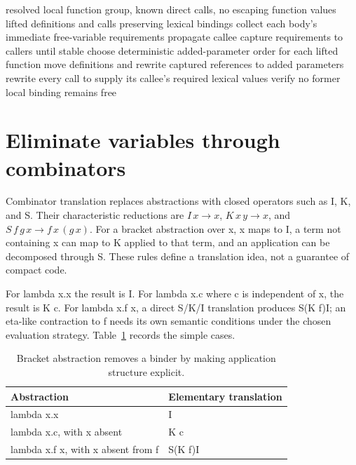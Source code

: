 \begin{algorithm}[htbp]
\caption{Lift a nonescaping direct-call group with propagated capture requirements.}
\label{alg:ch91-lift}
\begin{pseudocode}
\Require resolved local function group, known direct calls, no escaping function values
\Ensure lifted definitions and calls preserving lexical bindings
\State collect each body's immediate free-variable requirements
\State propagate callee capture requirements to callers until stable
\State choose deterministic added-parameter order for each lifted function
\State move definitions and rewrite captured references to added parameters
\State rewrite every call to supply its callee's required lexical values
\State verify no former local binding remains free
\end{pseudocode}
\end{algorithm}

\section{Eliminate variables through combinators}
\label{sec:ch91-combinators}
Combinator translation replaces abstractions with closed operators such as I, K, and S.
Their characteristic reductions are $I\,x\to x$, $K\,x\,y\to x$, and $S\,f\,g\,x\to f\,x\,(g\,x)$.
For a bracket abstraction over x, x maps to I, a term not containing x can map to K applied to that term, and an application can be decomposed through S.
These rules define a translation idea, not a guarantee of compact code.

For lambda x.x the result is I.
For lambda x.c where c is independent of x, the result is K c.
For lambda x.f x, a direct S/K/I translation produces S(K f)I; an eta-like contraction to f needs its own semantic conditions under the chosen evaluation strategy.
Table~\ref{tab:ch91-combinators} records the simple cases.

\begin{table}[htbp]
\caption{Bracket abstraction removes a binder by making application structure explicit.}
\label{tab:ch91-combinators}
\centering
\begin{tabular}{ll}
\toprule
Abstraction & Elementary translation \\
\midrule
lambda x.x & I \\
lambda x.c, with x absent & K c \\
lambda x.f x, with x absent from f & S(K f)I \\
\bottomrule
\end{tabular}
\end{table}

